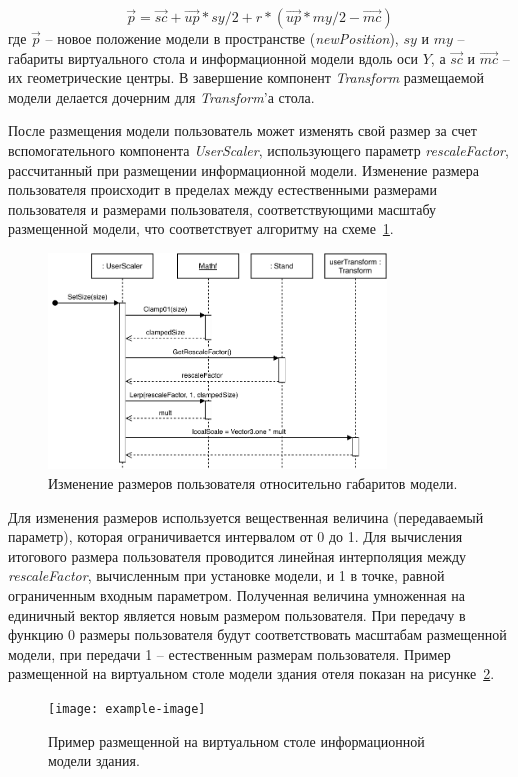\[
    \vec{p} = \vec{sc} +
    \vec{up} * sy / 2 +
    r * (
        \vec{up} * my / 2 - \vec{mc}
    )
\]
где $\vec{p}$ -- новое положение модели в пространстве (\emph{newPosition}),
$sy$ и $my$ -- габариты виртуального стола и информационной модели
вдоль оси $Y$, а $\vec{sc}$ и $\vec{mc}$ -- их геометрические центры.
В завершение компонент \emph{Transform} размещаемой модели
делается дочерним для \emph{Transform}'а стола.

После размещения модели пользователь может изменять свой размер
за счет вспомогательного компонента \emph{UserScaler},
использующего параметр \emph{rescaleFactor}, рассчитанный
при размещении информационной модели. Изменение размера пользователя
происходит в пределах между естественными размерами пользователя
и размерами пользователя, соответствующими масштабу размещенной модели,
что соответствует алгоритму на схеме~\ref{figure:SSetUserSize}.

\begin{figure}[!htp]
    \centering
    \includegraphics[width=0.8\textwidth]{images/UML-SSetUserSize.pdf}
    \caption{Изменение размеров пользователя
    относительно габаритов модели.}
    \label{figure:SSetUserSize}
\end{figure}

Для изменения размеров используется вещественная величина
(передаваемый параметр), которая ограничивается интервалом от 0 до 1.
Для вычисления итогового размера пользователя
проводится линейная интерполяция между \emph{rescaleFactor},
вычисленным при установке модели, и 1 в точке, равной
ограниченным входным параметром.
Полученная величина умноженная на единичный вектор
является новым размером пользователя.
При передачу в функцию 0 размеры пользователя будут
соответствовать масштабам размещенной модели,
при передачи 1 -- естественным размерам пользователя.
Пример размещенной на виртуальном столе модели здания отеля
показан на рисунке~\ref{figure:PlacedModelExample}.

\begin{figure}[!htp]
    \centering
    \texttt{[image: example-image]}
    \caption{Пример размещенной на виртуальном столе
    информационной модели здания.}
    \label{figure:PlacedModelExample}
\end{figure}
